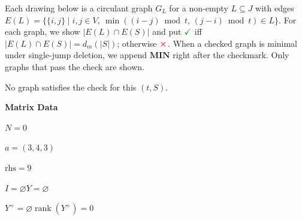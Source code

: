 \documentclass[11pt]{article}
\begin{document}
Each drawing below is a circulant graph $G_{L}$ for a non-empty $L\subseteq J$ with edges $E(L)=\{\{i,j\}\mid i,j\in V,\ \min((i-j)\bmod t,\,(j-i)\bmod t)\in L\}$.
For each graph, we show $|E(L)\cap E(S)|$ and put $\textcolor{green!60!black}{\checkmark}$ iff $|E(L)\cap E(S)|=d_m(|S|)$; otherwise $\textcolor{red}{\boldsymbol{\times}}$.
When a checked graph is minimal under single-jump deletion, we append $\textbf{MIN}$ right after the checkmark.
Only graphs that pass the check are shown. 

\noindent No graph satisfies the check for this $(t,S)$.

\noindent\textbf{Matrix Data}
\par $N=0$
\par $a=\left(3,4,3\right)$
\par $\mathrm{rhs}=9$
\par $I=\varnothing$\quad$Y=\varnothing$
\par $Y^{+}=\varnothing$\quad$\operatorname{rank}(Y^{+})=0$
\end{document}
